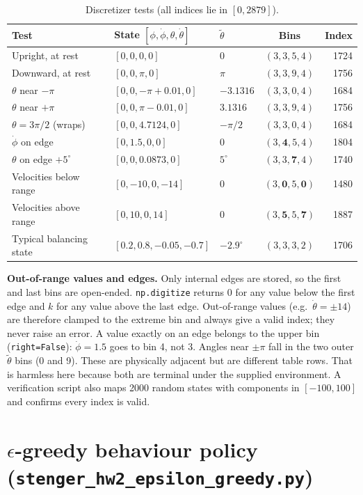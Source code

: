 \documentclass[11pt]{article}
\newcommand{\thw}{\tilde\theta}
\begin{document}
\begin{table}[H]
\centering\small
\begin{tabular}{lll c r}\toprule
Test & State $[\phi,\dot\phi,\theta,\dot\theta]$ & $\thw$ & Bins & Index\\\midrule
Upright, at rest & $[0,0,0,0]$ & $0$ & $(3,3,5,4)$ & 1724\\
Downward, at rest & $[0,0,\pi,0]$ & $\pi$ & $(3,3,9,4)$ & 1756\\
$\theta$ near $-\pi$ & $[0,0,-\pi+0.01,0]$ & $-3.1316$ & $(3,3,0,4)$ & 1684\\
$\theta$ near $+\pi$ & $[0,0,\pi-0.01,0]$ & $3.1316$ & $(3,3,9,4)$ & 1756\\
$\theta=3\pi/2$ (wraps) & $[0,0,4.7124,0]$ & $-\pi/2$ & $(3,3,0,4)$ & 1684\\
$\dot\phi$ on edge & $[0,1.5,0,0]$ & $0$ & $(3,\mathbf 4,5,4)$ & 1804\\
$\theta$ on edge $+5^\circ$ & $[0,0,0.0873,0]$ & $5^\circ$ & $(3,3,\mathbf 7,4)$ & 1740\\
Velocities below range & $[0,-10,0,-14]$ & $0$ & $(3,\mathbf 0,5,\mathbf 0)$ & 1480\\
Velocities above range & $[0,10,0,14]$ & $0$ & $(3,\mathbf 5,5,\mathbf 7)$ & 1887\\
Typical balancing state & $[0.2,0.8,-0.05,-0.7]$ & $-2.9^\circ$ & $(3,3,3,2)$ & 1706\\\bottomrule
\end{tabular}
\caption{Discretizer tests (all indices lie in $[0,2879]$).}
\end{table}

\textbf{Out-of-range values and edges.} Only internal edges are stored, so the
first and last bins are open-ended. \texttt{np.digitize} returns 0 for any value
below the first edge and $k$ for any value above the last edge. Out-of-range
values (e.g.\ $\dot\theta=\pm14$) are therefore clamped to the extreme bin and
always give a valid index; they never raise an error. A value exactly on an edge
belongs to the upper bin (\texttt{right=False}): $\dot\phi=1.5$ goes to bin 4,
not 3. Angles near $\pm\pi$ fall in the two outer $\thw$ bins (0 and 9). These
are physically adjacent but are different table rows. That is harmless here
because both are terminal under the supplied environment. A verification script
also maps 2000 random states with components in $[-100,100]$ and confirms every
index is valid.

\section{$\epsilon$-greedy behaviour policy (\texttt{stenger\_hw2\_epsilon\_greedy.py})}
\end{document}
